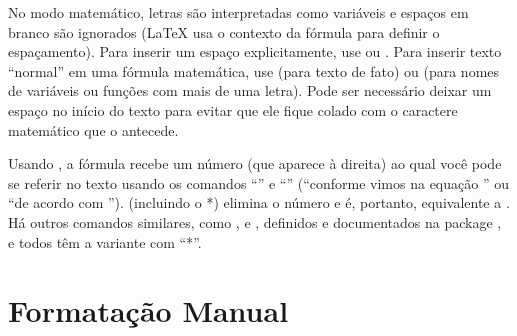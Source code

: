 No modo matemático, letras são interpretadas como variáveis e espaços
em branco são ignorados (\LaTeX{} usa o contexto da fórmula para
definir o espaçamento). Para inserir um espaço explicitamente, use
 ou . Para inserir texto ``normal'' em
uma fórmula matemática, use  (para texto de fato)
ou  (para nomes de variáveis ou funções com
mais de uma letra). Pode ser necessário deixar um espaço no início do
texto para evitar que ele fique colado com o caractere matemático que
o antecede.

Usando , a fórmula recebe um número (que
aparece à direita) ao qual você pode se referir no texto usando os
comandos ``'' e ``'' (``\textsf{conforme
vimos na equação }'' ou
``\textsf{de acordo com }'').
 (incluindo o *) elimina o número e é,
portanto, equivalente a . Há outros
comandos similares, como ,  e ,
definidos e documentados na package , e todos têm
a variante com ``*''.

\section{Formatação Manual}

